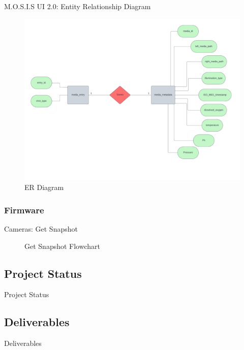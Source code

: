 \documentclass[17pt, aspectratio=169]{beamer}
\begin{document}
\begin{frame}{M.O.S.I.S UI 2.0: Entity Relationship Diagram}
	\begin{figure}
		\includegraphics[page=1,height=0.65\textheight]{../../Progress_Report_Document/Appendix/Design_Documentation/ER_Diagram/Figures/ER_Diagram_MOSIS.pdf}
		\caption{ER Diagram}
	\end{figure}
\end{frame}
\subsubsection{Firmware}
\begin{frame}{Cameras: Get Snapshot}
	\begin{figure}[H]
		\begin{center}
			\begin{small}
			\end{small}
		\end{center}
		\caption{Get Snapshot Flowchart}
	\end{figure}
\end{frame}
\subsection{Project Status}
\begin{frame}{Project Status}

\end{frame}
\subsection{Deliverables}
\begin{frame}{Deliverables}

\end{frame}
\end{document}
